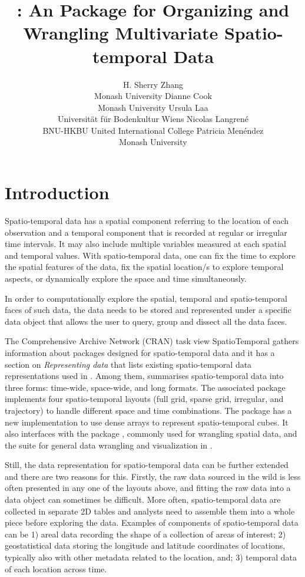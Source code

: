 \documentclass[
]{jss}
\author{
H. Sherry Zhang\\Monash University \And Dianne Cook\\Monash
University \And Ursula Laa\\Universität für Bodenkultur Wiens
\AND Nicolas Langrené\\BNU-HKBU United International
College \And Patricia Menéndez\\Monash University
}
\title{\pkg{cubble}: An \proglang{R} Package for Organizing and
Wrangling Multivariate Spatio-temporal Data}
\begin{document}
\hypertarget{introduction}{%
\section{Introduction}\label{introduction}}

Spatio-temporal data has a spatial component referring to the location
of each observation and a temporal component that is recorded at regular
or irregular time intervals. It may also include multiple variables
measured at each spatial and temporal values. With spatio-temporal data,
one can fix the time to explore the spatial features of the data, fix
the spatial location/s to explore temporal aspects, or dynamically
explore the space and time simultaneously.

In order to computationally explore the spatial, temporal and
spatio-temporal faces of such data, the data needs to be stored and
represented under a specific data object that allows the user to query,
group and dissect all the data faces.

The Comprehensive  Archive Network (CRAN) task view
SpatioTemporal \citep{ctvspatiotemporal} gathers information about
 packages designed for spatio-temporal data and it has a
section on \emph{Representing data} that lists existing spatio-temporal
data representations used in . Among them, \citet{spacetime}
summarises spatio-temporal data into three forms: time-wide, space-wide,
and long formats. The associated package 
\citep{spacetime} implements four spatio-temporal layouts (full grid,
sparse grid, irregular, and trajectory) to handle different space and
time combinations. The package  \citep{stars} has a new
implementation to use dense arrays to represent spatio-temporal cubes.
It also interfaces with the package  \citep{sf}, commonly used
for wrangling spatial data, and the  \citep{tidyverse}
suite for general data wrangling and visualization in .

Still, the data representation for spatio-temporal data can be further
extended and there are two reasons for this. Firstly, the raw data
sourced in the wild is less often presented in any one of the layouts
above, and fitting the raw data into a data object can sometimes be
difficult. More often, spatio-temporal data are collected in separate 2D
tables and analysts need to assemble them into a whole piece before
exploring the data. Examples of components of spatio-temporal data can
be 1) areal data recording the shape of a collection of areas of
interest; 2) geostatistical data storing the longitude and latitude
coordinates of locations, typically also with other metadata related to
the location, and; 3) temporal data of each location across time.
\end{document}
